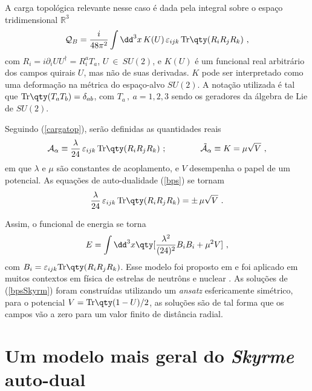 A carga topológica relevante nesse caso é dada pela integral sobre o espaço tridimensional $\mathbb{R}^3$
\begin{equation}
    \mathcal{Q}_B = \dfrac{i}{48\pi^2}\int \dd^3x \, K(U) \, \varepsilon_{ijk} \, \text{Tr}\qty(R_i R_j R_k) \ ,
    \label{QSkyrm}
\end{equation}
com $R_i = i\partial_i U U^{\dag} = R_i^{a}T_a$, $U \ \in \ SU(2)$, e $K(U)$ é um funcional real arbitrário dos campos quirais $U$, mas não de suas derivadas. $K$ pode ser interpretado como uma deformação na métrica do espaço-alvo $SU(2)$. A notação utilizada é tal que $\text{Tr}\qty(T_aT_b) = \delta_{ab}$, com $T_a \, , \ a=1,2,3$ sendo os geradores da álgebra de Lie de $SU(2)$.

Seguindo (\ref{cargatop}), serão definidas as quantidades reais
\begin{equation}
    \mathcal{A}_\alpha \equiv \dfrac{\lambda}{24}\, \varepsilon_{ijk} \, \text{Tr}\qty(R_iR_jR_k) \ ; \qquad\qquad \tilde{\mathcal{A}}_\alpha \equiv K = \mu \sqrt{V} \ ,
    \label{qntdsSkyrm}
\end{equation}
em que $\lambda$ e $\mu$ são constantes de acoplamento, e $V$ desempenha o papel de um potencial. As equações de auto-dualidade (\ref{bps}) se tornam
\begin{equation}
    \dfrac{\lambda}{24}\, \varepsilon_{ijk} \, \text{Tr}\qty(R_iR_jR_k) = \pm \, \mu \sqrt{V} \ .
    \label{bpsSkyrm}
\end{equation}

Assim, o funcional de energia se torna
\begin{equation}
    E = \int \dd^3x \qty[\dfrac{\lambda^2}{(24)^2}B_iB_i + \mu^2 V] \ ,
\end{equation}
com $B_i = \varepsilon_{ijk} \text{Tr}\qty(R_iR_jR_k)$. Esse modelo foi proposto em \cite{skyrmBarionic} e foi aplicado em muitos contextos em física de estrelas de neutrôns e nuclear \cite{SkyrmNeutron}. As soluções de (\ref{bpsSkyrm}) foram construídas utilizando um \textit{ansatz} esfericamente simétrico, para o potencial $V = \text{Tr}\qty(1-U)/2$, as soluções são de tal forma que os campos vão a zero para um valor finito de distância radial.

\section{Um modelo mais geral do \textit{Skyrme} auto-dual}

